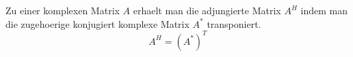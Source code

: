 Zu einer komplexen Matrix $A$ erhaelt man die adjungierte Matrix $A^H$ indem man die zugehoerige konjugiert komplexe Matrix $A^*$ transponiert.
$$A^H = (A^*)^T$$ 
